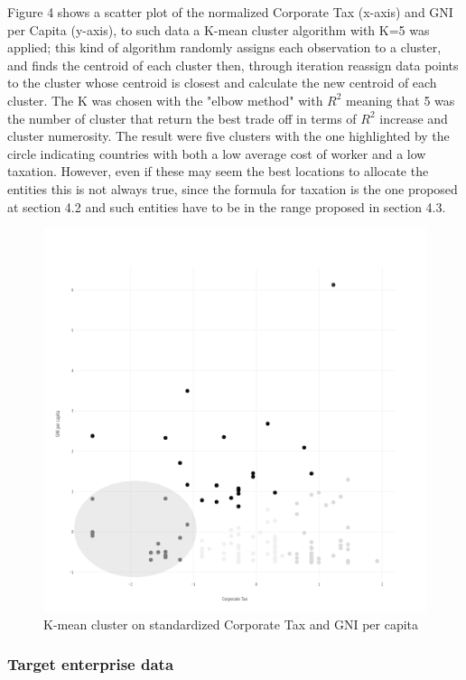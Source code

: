 \documentclass{article}
\begin{document}
Figure 4 shows a scatter plot of the normalized Corporate Tax (x-axis) and GNI per Capita (y-axis), to such data a  K-mean cluster algorithm with K=5 was applied; this kind of algorithm randomly assigns each observation to a cluster, and finds the centroid of each cluster then, through iteration reassign data points to the cluster whose centroid is closest and calculate the new centroid of each cluster. The K was chosen with the "elbow method" with $R^2$ meaning that 5 was the number of cluster that return the best trade off in terms of $R^2$ increase and cluster numerosity.
The result were five clusters with the one highlighted by the circle indicating countries with both a low average cost of worker and a low taxation. However, even if these may seem the best locations to allocate the entities this is not always true, since the formula for taxation is the one proposed at section 4.2 and such entities have to be in the range proposed in section 4.3.

\begin{figure}
\centering
\includegraphics[width=1\linewidth]{Images/Cluster-GNI-CT.png}
\caption{K-mean cluster on standardized Corporate Tax and GNI per capita}
\end{figure}

\subsubsection{Target enterprise data}
\end{document}
